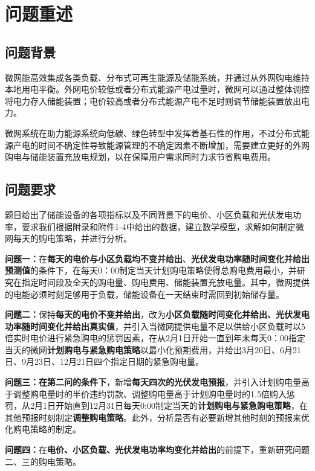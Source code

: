 \documentclass[withoutpreface,bwprint]{cumcmthesis} %
\begin{document}
\section{问题重述}

\subsection{问题背景}
微网能高效集成各类负载、分布式可再生能源及储能系统，并通过从外网购电维持本地用电平衡。外网电价较低或者分布式能源产电过量时，微网可以通过整体调控将电力存入储能装置；电价较高或者分布式能源产电不足时则调节储能装置放出电力。

微网系统在助力能源系统向低碳、绿色转型中发挥着基石性的作用，不过分布式能源产电的时间不确定性导致能源管理的不确定因素不断增加，需要建立更好的外网购电与储能装置充放电规划，以在保障用户需求同时力求节省购电费用。

\subsection{问题要求}
题目给出了储能设备的各项指标以及不同背景下的电价、小区负载和光伏发电功率，要求我们根据附录和附件1-4中给出的数据，建立数学模型，求解如何制定微网每天的购电策略，并进行分析。

\textbf{问题一：}在\textbf{每天的电价与小区负载均不变并给出}、\textbf{光伏发电功率随时间变化并给出预测值}的条件下，在每天0：00制定当天计划购电策略使得总购电费用最小，并研究在指定时间段及全天的购电量、购电费用、储能装置充放电量。其中，微网提供的电能必须时刻足够用于负载，储能设备在一天结束时需回到初始储存量。

\textbf{问题二：}保持\textbf{每天的电价不变并给出}，改为\textbf{小区负载随时间变化并给出、光伏发电功率随时间变化并给出真实值}，并引入当微网提供电量不足以供给小区负载时以5倍实时电价进行紧急购电的惩罚因素，在从2月1日开始一直到年末每天0：00指定当天的微网\textbf{计划购电与紧急购电策略}以最小化预期费用，并给出3月20日、6月21日、9月23日、12月21日四个指定日期的紧急购电量。

\textbf{问题三：}\textbf{在第二问的条件下}，新增\textbf{每天四次的光伏发电预报}，并引入计划购电量高于调整购电量时的半价违约罚款、调整购电量高于计划购电量时的1.5倍购入惩罚，从2月1日开始直到12月31日每天0:00制定当天的\textbf{计划购电与紧急购电策略}，在其他预报时刻制定\textbf{调整购电策略}。此外，分析是否有必要新增其他时刻的预报来优化购电策略的制定。

\textbf{问题四：}在\textbf{电价、小区负载、光伏发电功率均变化并给出}的前提下，重新研究问题二、三的购电策略。
\end{document}
